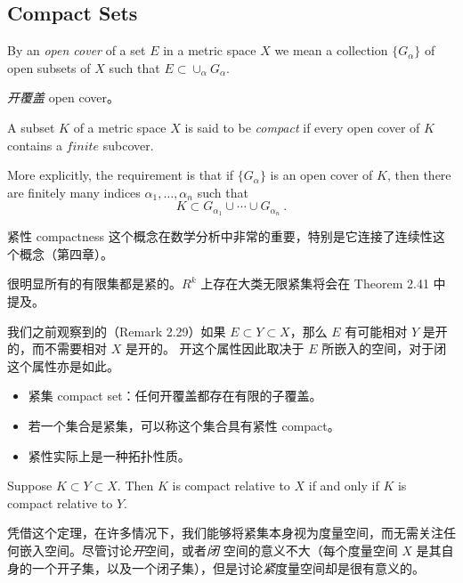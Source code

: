 \documentclass[../poma-notes.tex]{subfiles}
\begin{document}
\subsection*{Compact Sets}

\begin{definition}
  By an \textit{open cover} of a set $E$ in a metric space $X$ we mean a collection $\{G_{\alpha}\}$ of open subsets
  of $X$ such that $E \subset \cup_{\alpha} G_{\alpha}$.
\end{definition}

\begin{anote}
  \textit{开覆盖} open cover。
\end{anote}

\begin{definition}
  A subset $K$ of a metric space $X$ is said to be \textit{compact} if every open cover of $K$ contains a $finite$
  subcover.

  More explicitly, the requirement is that if $\{G_{\alpha}\}$ is an open cover of $K$, then there are finitely many
  indices $\alpha_1,\dots,\alpha_n$ such that
  \[K \subset G_{\alpha_1} \cup \cdots \cup G_{\alpha_n}\ .\]
\end{definition}

紧性 compactness 这个概念在数学分析中非常的重要，特别是它连接了连续性这个概念（第四章）。

很明显所有的有限集都是紧的。$R^k$ 上存在大类无限紧集将会在 Theorem 2.41 中提及。

我们之前观察到的（Remark 2.29）如果 $E \subset Y \subset X$，那么 $E$ 有可能相对 $Y$ 是开的，而不需要相对 $X$ 是开的。
开这个属性因此取决于 $E$ 所嵌入的空间，对于闭这个属性亦是如此。

\begin{anote}
  \begin{itemize}
    \item 紧集 compact set：任何开覆盖都存在有限的子覆盖。
    \item 若一个集合是紧集，可以称这个集合具有紧性 compact。
    \item 紧性实际上是一种拓扑性质。
  \end{itemize}
\end{anote}

\begin{theorem}
  Suppose $K \subset Y \subset X$. Then $K$ is compact relative to $X$ if and only if $K$ is compact relative to $Y$.
\end{theorem}

凭借这个定理，在许多情况下，我们能够将紧集本身视为度量空间，而无需关注任何嵌入空间。尽管讨论\textit{开}空间，或者\textit{闭}
空间的意义不大（每个度量空间 $X$ 是其自身的一个开子集，以及一个闭子集），但是讨论\textit{紧}度量空间却是很有意义的。
\end{document}
